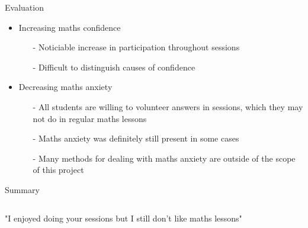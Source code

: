 \documentclass{beamer}  %
\begin{document}
\begin{frame}{Evaluation}
    \begin{itemize}
        \item Increasing maths confidence
        \begin{itemize}
            \item[-] Noticiable increase in participation throughout sessions
            \item[-] Difficult to distinguish causes of confidence
        \end{itemize}
        \item Decreasing maths anxiety
        \begin{itemize}
            \item[-] All students are willing to volunteer answers in sessions, which they may not do in regular maths lessons
            \item[-] Maths anxiety was definitely still present in some cases 
            \item[-] Many methods for dealing with maths anxiety are outside of the scope of this project
        \end{itemize}
    \end{itemize}


\end{frame}

\begin{frame}{Summary}
    \begin{columns}
            "I enjoyed doing your sessions but I still don't like maths lessons"
    \end{columns}
\end{frame}
\end{document}
